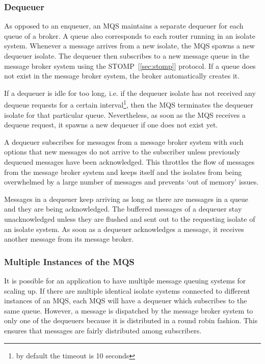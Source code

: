   \subsubsection{Dequeuer}
  As opposed to an enqueuer, an MQS maintains a separate dequeuer for each queue of a broker. A queue also corresponds to each router running in an isolate system. Whenever a message arrives from a new isolate, the MQS spawns a new dequeuer isolate. The dequeuer then subscribes to a new message queue in the message broker system using the STOMP~[\ref{sec:stomp}] protocol. If a queue does not exist in the message broker system, the broker automatically creates it.

  If a dequeuer is idle for too long, i.e. if the dequeuer isolate has not received any dequeue requests for a certain interval\footnote{by default the timeout is 10 seconds}, then the MQS terminates the dequeuer isolate for that particular queue. Nevertheless, as soon as the MQS receives a dequeue request, it spawns a new dequeuer if one does not exist yet.

  A dequeuer subscribes for messages from a message broker system with such options that new messages do not arrive to the subscriber unless previously dequeued messages have been acknowledged. This throttles the flow of messages from the message broker system and keeps itself and the isolates from being overwhelmed by a large number of messages and prevents ‘out of memory’ issues.

  Messages in a dequeuer keep arriving as long as there are messages in a queue and they are being acknowledged. The buffered messages of a dequeuer stay unacknowledged unless they are flushed and sent out to the requesting isolate of an isolate system. As soon as a dequeuer acknowledges a message, it receives another message from its message broker.

  \subsubsection{Multiple Instances of the MQS}
  It is possible for an application to have multiple message queuing systems for scaling up. If there are multiple identical isolate systems connected to different instances of an MQS, each MQS will have a dequeuer which subscribes to the same queue. However, a message is dispatched by the message broker system to only one of the dequeuers because it is distributed in a round robin fashion. This ensures that messages are fairly distributed among subscribers.

